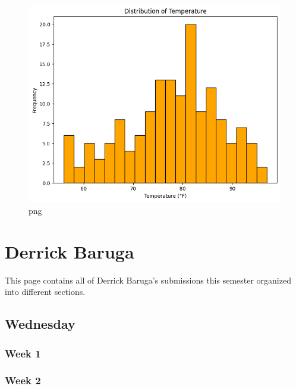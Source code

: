 \documentclass[
  letterpaper,
  DIV=11,
  numbers=noendperiod]{scrreprt}
\newenvironment{Shaded}{\begin{snugshade}}{\end{snugshade}}
\begin{document}
\begin{figure}[H]

{\centering \includegraphics{Tut2_Python_Pena_092024_files/Tut2_Python_Pena_092024_10_0.png}

}

\caption{png}

\end{figure}%

\begin{Shaded}
\begin{Highlighting}[]

\end{Highlighting}
\end{Shaded}

\chapter{Derrick Baruga}\label{derrick-baruga}

This page contains all of Derrick Baruga's submissions this semester
organized into different sections.

\section{Wednesday}\label{wednesday-2}

\subsection{Week 1}\label{week-1-4}

\subsection{Week 2}\label{week-2-4}
\end{document}

